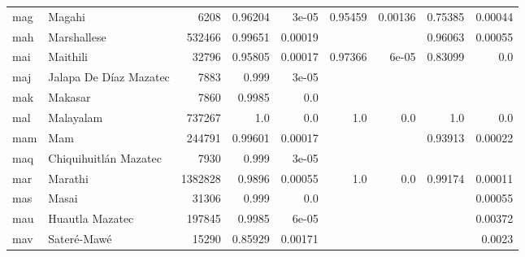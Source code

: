 \documentclass[11pt]{article}
\begin{document}
\begin{table*}[h]
{\begin{tabular}{llrrrrrrr}
mag         & Magahi         & 6208         & 0.96204         & 3e-05         & 0.95459         & 0.00136         & 0.75385         & 0.00044         \\

mah         & Marshallese         & 532466         & 0.99651         & 0.00019         &          &          & 0.96063         & 0.00055         \\

mai         & Maithili         & 32796         & 0.95805         & 0.00017         & 0.97366         & 6e-05         & 0.83099         & 0.0         \\

maj         & Jalapa De Díaz Mazatec         & 7883         & 0.999         & 3e-05         &          &          &          &          \\

mak         & Makasar         & 7860         & 0.9985         & 0.0         &          &          &          &          \\

mal         & Malayalam         & 737267         & 1.0         & 0.0         & 1.0         & 0.0         & 1.0         & 0.0         \\

mam         & Mam         & 244791         & 0.99601         & 0.00017         &          &          & 0.93913         & 0.00022         \\

maq         & Chiquihuitlán Mazatec         & 7930         & 0.999         & 3e-05         &          &          &          &          \\

mar         & Marathi         & 1382828         & 0.9896         & 0.00055         & 1.0         & 0.0         & 0.99174         & 0.00011         \\

mas         & Masai         & 31306         & 0.999         & 0.0         &          &          &          & 0.00055         \\

mau         & Huautla Mazatec         & 197845         & 0.9985         & 6e-05         &          &          &          & 0.00372         \\

mav         & Sateré-Mawé         & 15290         & 0.85929         & 0.00171         &          &          &          & 0.0023         \\


\end{tabular}}
\end{table*}
\end{document}
